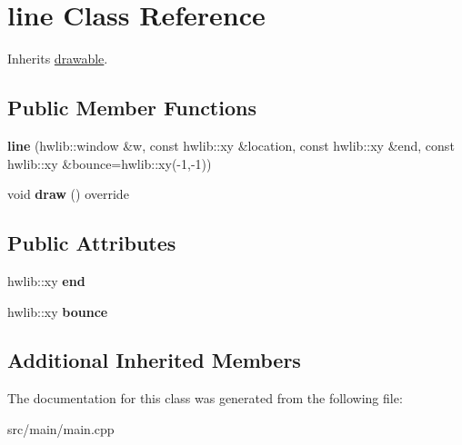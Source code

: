 \hypertarget{classline}{}\section{line Class Reference}
\label{classline}


Inherits \hyperlink{classdrawable}{drawable}.

\subsection*{Public Member Functions}
\begin{DoxyCompactItemize}
\item 
\mbox{\label{classline_acb74b20eee608159a760db22bac1d4dc}} 
{\bfseries line} (hwlib\+::window \&w, const hwlib\+::xy \&location, const hwlib\+::xy \&end, const hwlib\+::xy \&bounce=hwlib\+::xy(-\/1,-\/1))
\item 
\mbox{\label{classline_af667c8ab35370df5d90e595cfb647c72}} 
void {\bfseries draw} () override
\end{DoxyCompactItemize}
\subsection*{Public Attributes}
\begin{DoxyCompactItemize}
\item 
\mbox{\label{classline_a30ec92a5133ff8afd605826e3ffb81bb}} 
hwlib\+::xy {\bfseries end}
\item 
\mbox{\label{classline_a05459d201bce4a56227e2515229f5def}} 
hwlib\+::xy {\bfseries bounce}
\end{DoxyCompactItemize}
\subsection*{Additional Inherited Members}


The documentation for this class was generated from the following file\+:\begin{DoxyCompactItemize}
\item 
src/main/main.\+cpp\end{DoxyCompactItemize}
